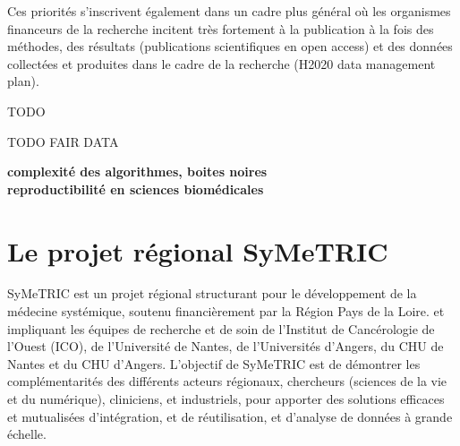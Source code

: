 \documentclass[a4paper,11pt]{article}
\theoremstyle{definition}
\begin{document}
Ces priorités s'inscrivent également dans un cadre plus général où les organismes financeurs de la recherche incitent très fortement à la publication à la fois des méthodes, des résultats (publications scientifiques en open access) et des données collectées et produites dans le cadre de la recherche (H2020 data management plan). 

TODO~\cite{bigdata}

TODO FAIR DATA~\cite{wilkinson2016fair}

{\bf complexité des algorithmes, boites noires} \\
{\bf reproductibilité en sciences biomédicales} 





\section{Le projet régional SyMeTRIC}
SyMeTRIC est un projet régional structurant pour le développement de la médecine systémique, soutenu financièrement par la Région Pays de la Loire. et impliquant les équipes de recherche et de soin de l’Institut de Cancérologie de l’Ouest (ICO), de l’Université de Nantes, de l’Universités d’Angers, du CHU de Nantes et du CHU d’Angers. L'objectif de SyMeTRIC est de démontrer les complémentarités des différents acteurs régionaux, chercheurs (sciences de la vie et du numérique), cliniciens, et industriels, pour apporter des solutions efficaces et mutualisées d'intégration, et de réutilisation, et d'analyse de données à grande échelle. 
\end{document}
